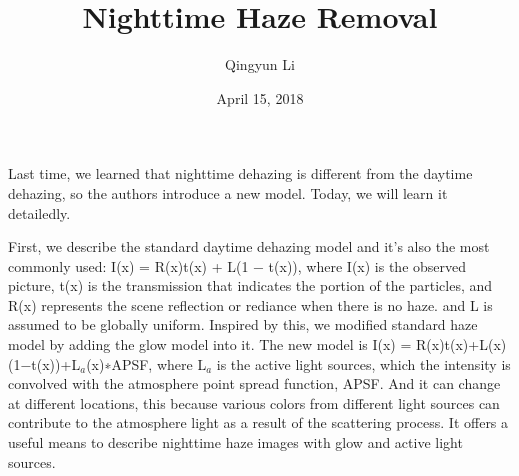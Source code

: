\documentclass{article}
\author{Qingyun Li}
\date{April 15, 2018}
\title{Nighttime Haze Removal}
\begin{document}
\maketitle
\par Last time, we learned that nighttime dehazing is different from the daytime dehazing, so the authors introduce a new model. Today, we will learn it detailedly.
\par First, we describe the standard daytime dehazing model and it's also the most commonly used: I(x) = R(x)t(x) + L(1 − t(x)), where I(x) is the observed picture, t(x) is the transmission that indicates the portion of the particles, and R(x) represents the scene reflection or rediance when there is no haze. and L is assumed to be globally uniform. Inspired by this, we modified standard haze model by adding the glow model into it. The new model is I(x) = R(x)t(x)+L(x)(1−t(x))+L$ _a $(x)∗APSF, where L$ _a $ is the active light sources, which the intensity is convolved with the atmosphere point spread function, APSF. And it can change at different locations, this because various colors from different light sources can contribute to the atmosphere light as a result of the scattering process. It offers a useful means to describe nighttime haze images with glow and active light sources.
\end{document}
